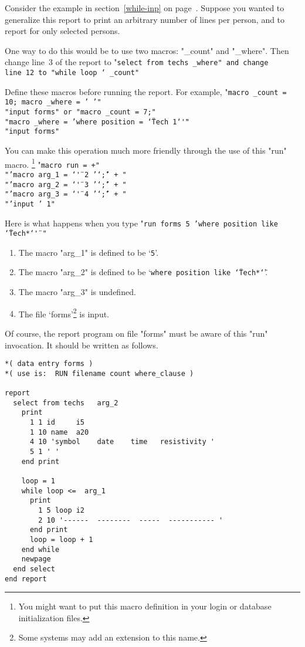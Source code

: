 \documentclass[11pt,a4paper]{report}
\begin{document}
Consider the example in section~\ref{while-inp}
on page~\pageref{while-inp}.
Suppose you wanted to generalize this report to print
an arbitrary number of lines per person, and
to report for only selected persons.
 
One way to do this would be to use
two macros: "\_count" and "\_where".
Then
change line~3 of the report to
"\tt select from techs \_where"
and change line~12 to
"\tt while loop \char` \_count"
 
Define these macros before running the report.
For example,
"\tt macro \_count = 10; macro \_where = ' '"\\
  "\tt input forms"
or
"\tt macro \_count = 7;"\\
  "\tt macro \_where = 'where position = \char`\"Tech 1\char`\"'"\\
  "\tt input forms"
 
\medskip
 
You can make this operation much more friendly through the use
of this "run" macro.%
\footnote{You might want to put this macro definition in your
  login or database initialization files.}
"\tt macro run = +"\\
  "\tt\qquad 'macro arg\_1 = \char`\"' 2 '\char`\";' + "\\
  "\tt\qquad 'macro arg\_2 = \char`\"' 3 '\char`\";' + "\\
  "\tt\qquad 'macro arg\_3 = \char`\"' 4 '\char`\";' + "\\
  "\tt\qquad 'input ' 1"
 
Here is what happens when you type
"\tt run forms 5 'where position like \char`\"Tech*\char`\"' "
\begin{enumerate}
\item The macro "arg\_1" is defined to be `{\tt5}'.
\item The macro "arg\_2" is defined to be
      `{\tt where position like \char`\"Tech*\char`\"}'.
\item The macro "arg\_3" is undefined.
\item The file `forms'\footnote{Some systems may add an
extension to this name.} is input.
 
\end{enumerate}
 
Of course, the report program on file "forms" must be aware of
this "run" invocation.  It should be written as follows.
 
\demobreak
\begin{verbatim}
*( data entry forms )
*( use is:  RUN filename count where_clause )
 
report
  select from techs   arg_2
    print
      1 1 id     i5
      1 10 name  a20
      4 10 'symbol    date    time   resistivity '
      5 1 ' '
    end print
 
    loop = 1
    while loop <=  arg_1
      print
        1 5 loop i2
        2 10 '------  --------  -----  ----------- '
      end print
      loop = loop + 1
    end while
    newpage
  end select
end report
\end{verbatim}
 
\end{document}
